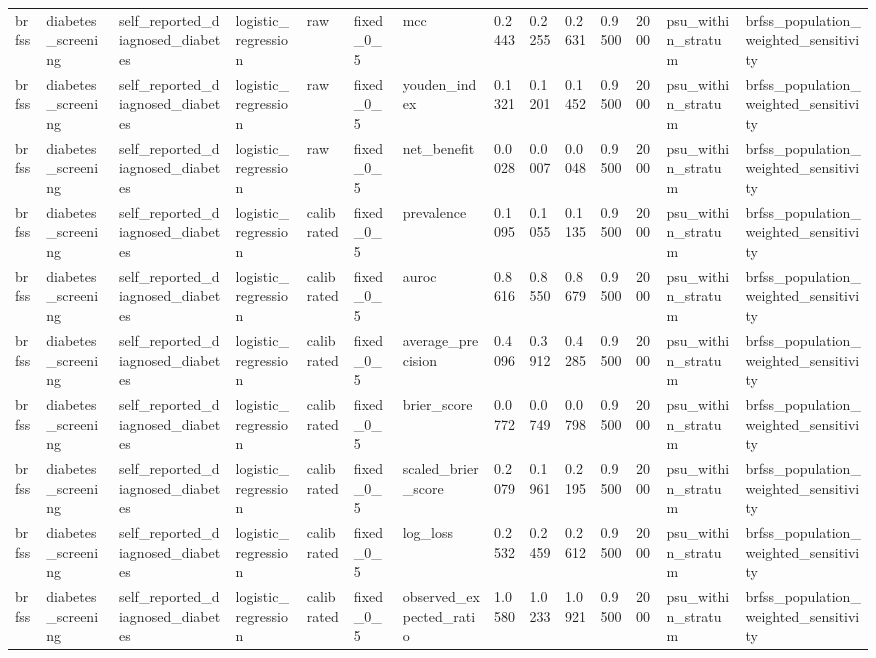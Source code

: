 \begin{tabular}{llllllllllllll}
brfss & diabetes\_screening & self\_reported\_diagnosed\_diabetes & logistic\_regression & raw & fixed\_0\_5 & mcc & 0.2443 & 0.2255 & 0.2631 & 0.9500 & 2000 & psu\_within\_stratum & brfss\_population\_weighted\_sensitivity \\
brfss & diabetes\_screening & self\_reported\_diagnosed\_diabetes & logistic\_regression & raw & fixed\_0\_5 & youden\_index & 0.1321 & 0.1201 & 0.1452 & 0.9500 & 2000 & psu\_within\_stratum & brfss\_population\_weighted\_sensitivity \\
brfss & diabetes\_screening & self\_reported\_diagnosed\_diabetes & logistic\_regression & raw & fixed\_0\_5 & net\_benefit & 0.0028 & 0.0007 & 0.0048 & 0.9500 & 2000 & psu\_within\_stratum & brfss\_population\_weighted\_sensitivity \\
brfss & diabetes\_screening & self\_reported\_diagnosed\_diabetes & logistic\_regression & calibrated & fixed\_0\_5 & prevalence & 0.1095 & 0.1055 & 0.1135 & 0.9500 & 2000 & psu\_within\_stratum & brfss\_population\_weighted\_sensitivity \\
brfss & diabetes\_screening & self\_reported\_diagnosed\_diabetes & logistic\_regression & calibrated & fixed\_0\_5 & auroc & 0.8616 & 0.8550 & 0.8679 & 0.9500 & 2000 & psu\_within\_stratum & brfss\_population\_weighted\_sensitivity \\
brfss & diabetes\_screening & self\_reported\_diagnosed\_diabetes & logistic\_regression & calibrated & fixed\_0\_5 & average\_precision & 0.4096 & 0.3912 & 0.4285 & 0.9500 & 2000 & psu\_within\_stratum & brfss\_population\_weighted\_sensitivity \\
brfss & diabetes\_screening & self\_reported\_diagnosed\_diabetes & logistic\_regression & calibrated & fixed\_0\_5 & brier\_score & 0.0772 & 0.0749 & 0.0798 & 0.9500 & 2000 & psu\_within\_stratum & brfss\_population\_weighted\_sensitivity \\
brfss & diabetes\_screening & self\_reported\_diagnosed\_diabetes & logistic\_regression & calibrated & fixed\_0\_5 & scaled\_brier\_score & 0.2079 & 0.1961 & 0.2195 & 0.9500 & 2000 & psu\_within\_stratum & brfss\_population\_weighted\_sensitivity \\
brfss & diabetes\_screening & self\_reported\_diagnosed\_diabetes & logistic\_regression & calibrated & fixed\_0\_5 & log\_loss & 0.2532 & 0.2459 & 0.2612 & 0.9500 & 2000 & psu\_within\_stratum & brfss\_population\_weighted\_sensitivity \\
brfss & diabetes\_screening & self\_reported\_diagnosed\_diabetes & logistic\_regression & calibrated & fixed\_0\_5 & observed\_expected\_ratio & 1.0580 & 1.0233 & 1.0921 & 0.9500 & 2000 & psu\_within\_stratum & brfss\_population\_weighted\_sensitivity \\

\end{tabular}
